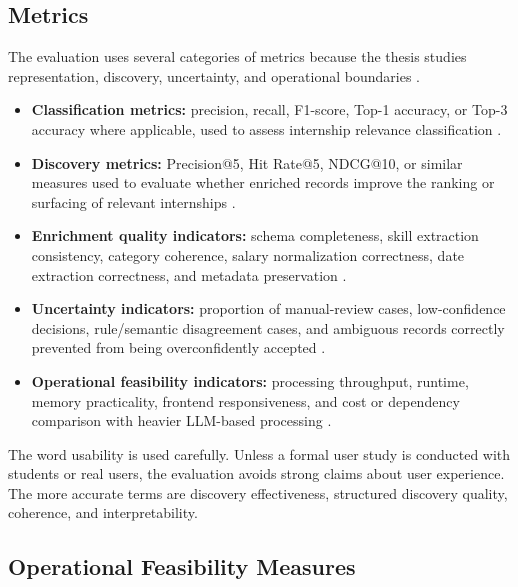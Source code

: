 \subsection{Metrics}

The evaluation uses several categories of metrics because the thesis studies representation, discovery, uncertainty, and operational boundaries \cite{sokolova2009systematic, jarvelin2002cumulated, jain1991art}.

\begin{itemize}
    \item \textbf{Classification metrics:} precision, recall, F1-score, Top-1 accuracy, or Top-3 accuracy where applicable, used to assess internship relevance classification \cite{sokolova2009systematic}.

    \item \textbf{Discovery metrics:} Precision@5, Hit Rate@5, NDCG@10, or similar measures used to evaluate whether enriched records improve the ranking or surfacing of relevant internships \cite{manning2008introduction, jarvelin2002cumulated}.

    \item \textbf{Enrichment quality indicators:} schema completeness, skill extraction consistency, category coherence, salary normalization correctness, date extraction correctness, and metadata preservation \cite{batini2009methodologies}.

    \item \textbf{Uncertainty indicators:} proportion of manual-review cases, low-confidence decisions, rule/semantic disagreement cases, and ambiguous records correctly prevented from being overconfidently accepted \cite{krippendorff2004content}.

    \item \textbf{Operational feasibility indicators:} processing throughput, runtime, memory practicality, frontend responsiveness, and cost or dependency comparison with heavier LLM-based processing \cite{jain1991art, schwartz2020green}.
\end{itemize}

The word usability is used carefully. Unless a formal user study is conducted with students or real users, the evaluation avoids strong claims about user experience. The more accurate terms are discovery effectiveness, structured discovery quality, coherence, and interpretability.

\subsection{Operational Feasibility Measures}

